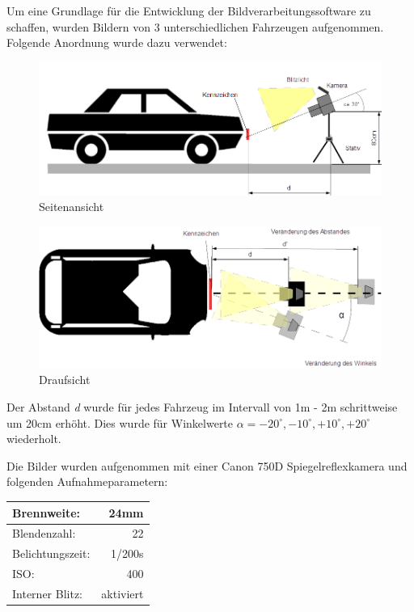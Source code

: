 \documentclass{../Vorlage/sebDenCls}
\begin{document}
Um eine Grundlage für die Entwicklung der Bildverarbeitungssoftware zu schaffen, wurden Bildern von 3 unterschiedlichen Fahrzeugen aufgenommen. Folgende Anordnung wurde dazu verwendet:

\begin{figure}[htp]

	\includegraphics[width=.9\textwidth]{Skizze_Aufg_5_seite} 
	\caption{Seitenansicht \label{seitenansicht}}
\end{figure}

\begin{figure}[htp]
		\centering 	
\includegraphics[width=.9\textwidth]{Skizze_Aufg_5_oben} 
\caption{Draufsicht\label{draufsicht}}
\end{figure}

Der Abstand \emph{d} wurde für jedes Fahrzeug im Intervall von 1m - 2m schrittweise um 20cm erhöht. Dies wurde für Winkelwerte $\alpha = -20^\circ,-10^\circ,+10^\circ,+20^\circ$ wiederholt.


Die Bilder wurden aufgenommen mit einer Canon 750D Spiegelreflexkamera und folgenden Aufnahmeparametern:

\begin{center}
\begin{tabular} {| l | r |}
	\hline
Brennweite: & 24mm \\ \hline
Blendenzahl: & 22 \\\hline
Belichtungszeit: & 1/200s \\\hline
ISO: & 400 \\\hline
Interner Blitz: & aktiviert \\\hline
\end{tabular}
\end{center}
\end{document}
